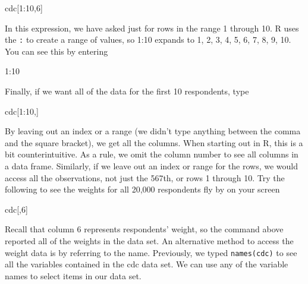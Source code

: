 \documentclass[]{article}
\newenvironment{Shaded}{\begin{snugshade}}{\end{snugshade}}
\newcommand{\DecValTok}[1]{\textcolor[rgb]{0.00,0.00,0.81}{{#1}}}
\newcommand{\NormalTok}[1]{{#1}}
\begin{document}
\begin{Shaded}
\begin{Highlighting}[]
\NormalTok{cdc[}\DecValTok{1}\NormalTok{:}\DecValTok{10}\NormalTok{,}\DecValTok{6}\NormalTok{]}
\end{Highlighting}
\end{Shaded}

In this expression, we have asked just for rows in the range 1 through
10. R uses the \texttt{:} to create a range of values, so 1:10 expands
to 1, 2, 3, 4, 5, 6, 7, 8, 9, 10. You can see this by entering

\begin{Shaded}
\begin{Highlighting}[]
\DecValTok{1}\NormalTok{:}\DecValTok{10}
\end{Highlighting}
\end{Shaded}

Finally, if we want all of the data for the first 10 respondents, type

\begin{Shaded}
\begin{Highlighting}[]
\NormalTok{cdc[}\DecValTok{1}\NormalTok{:}\DecValTok{10}\NormalTok{,]}
\end{Highlighting}
\end{Shaded}

By leaving out an index or a range (we didn't type anything between the
comma and the square bracket), we get all the columns. When starting out
in R, this is a bit counterintuitive. As a rule, we omit the column
number to see all columns in a data frame. Similarly, if we leave out an
index or range for the rows, we would access all the observations, not
just the 567th, or rows 1 through 10. Try the following to see the
weights for all 20,000 respondents fly by on your screen

\begin{Shaded}
\begin{Highlighting}[]
\NormalTok{cdc[,}\DecValTok{6}\NormalTok{]}
\end{Highlighting}
\end{Shaded}

Recall that column 6 represents respondents' weight, so the command
above reported all of the weights in the data set. An alternative method
to access the weight data is by referring to the name. Previously, we
typed \texttt{names(cdc)} to see all the variables contained in the cdc
data set. We can use any of the variable names to select items in our
data set.
\end{document}
